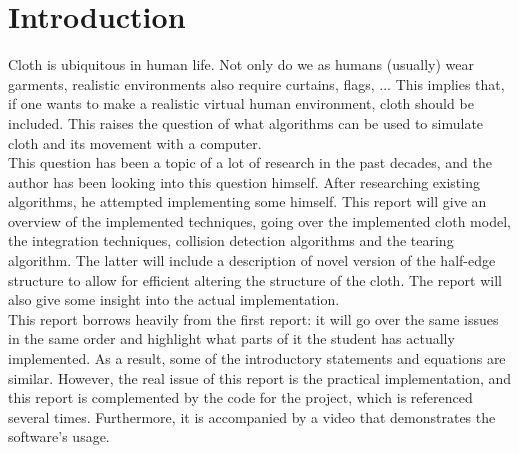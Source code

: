 
\ifx\isEmbedded\undefined

\graphicspath{{../img/}}

\fi

\section{Introduction}

Cloth is ubiquitous in human life. Not only do we as humans (usually) wear garments, realistic environments also require curtains, flags, ... This implies that, if one wants to make a realistic virtual human environment, cloth should be included. This raises the question of what algorithms can be used to simulate cloth and its movement with a computer.\\

This question has been a topic of a lot of research in the past decades, and the author has been looking into this question himself. After researching existing algorithms, he attempted implementing some himself. This report will give an overview of the implemented techniques, going over the implemented cloth model, the integration techniques, collision detection algorithms and the tearing algorithm. The latter will include a description of novel version of the half-edge structure to allow for efficient altering the structure of the cloth. The report will also give some insight into the actual implementation.\\

This report borrows heavily from the first report: it will go over the same issues in the same order and highlight what parts of it the student has actually implemented. As a result, some of the introductory statements and equations are similar. However, the real issue of this report is the practical implementation, and this report is complemented by the code for the project, which is referenced several times. Furthermore, it is accompanied by a video that demonstrates the software's usage.\\

\ifx\isEmbedded\undefined


\pagebreak

\fi